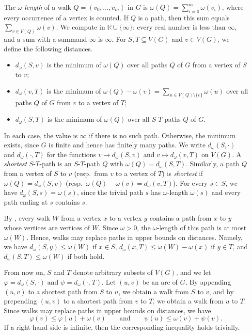 \documentclass[fontsize=12pt,leading=14pt]{fullpaper}
\begin{document}
\begin{definition}\label{def:geo}
  The \emph{$\omega$-length} of a walk $Q=(v_0,\dots,v_m)$ in $G$ is $\omega(Q)=\sum_{i=0}^m\omega(v_i)$, where every occurrence of a vertex is counted.
  If $Q$ is a path, then this sum equals $\sum_{v\in V(Q)}\omega(v)$.
  We compute in $\mathbb R\cup\{\infty\}$: every real number is less than $\infty$, and a sum with a summand $\infty$ is $\infty$.
  For $S,T\subseteq V(G)$ and $v\in V(G)$, we define the following distances.
  \begin{itemize}
    \item $d_\omega(S,v)$ is the minimum of $\omega(Q)$ over all paths $Q$ of $G$ from a vertex of $S$ to $v$;
    \item $d_\omega(v,T)$ is the minimum of $\omega(Q)-\omega(v)=\sum_{u\in V(Q)\setminus\{v\}}\omega(u)$ over all paths $Q$ of $G$ from $v$ to a vertex of $T$;
    \item $d_\omega(S,T)$ is the minimum of $\omega(Q)$ over all $S$-$T$-paths $Q$ of $G$.
  \end{itemize}
  In each case, the value is $\infty$ if there is no such path.
  Otherwise, the minimum exists, since $G$ is finite and hence has finitely many paths.
  We write $d_\omega(S,\cdot)$ and $d_\omega(\cdot,T)$ for the functions $v\mapsto d_\omega(S,v)$ and $v\mapsto d_\omega(v,T)$ on $V(G)$.
  A \emph{shortest} $S$-$T$-path is an $S$-$T$-path $Q$ with $\omega(Q)=d_\omega(S,T)$.
  Similarly, a path $Q$ from a vertex of $S$ to $v$ (resp.\ from $v$ to a vertex of $T$) is \emph{shortest} if $\omega(Q)=d_\omega(S,v)$ (resp.\ $\omega(Q)-\omega(v)=d_\omega(v,T)$).
  For every $s\in S$, we have $d_\omega(S,s)=\omega(s)$, since the trivial path $s$ has $\omega$-length $\omega(s)$ and every path ending at $s$ contains $s$.
\end{definition}

By , every walk $W$ from a vertex $x$ to a vertex $y$ contains a path from $x$ to $y$ whose vertices are vertices of $W$.
Since $\omega>0$, the $\omega$-length of this path is at most $\omega(W)$.
Hence, walks may replace paths in upper bounds on distances.
Namely, we have $d_\omega(S,y)\le\omega(W)$ if $x\in S$, $d_\omega(x,T)\le\omega(W)-\omega(x)$ if $y\in T$, and $d_\omega(S,T)\le\omega(W)$ if both hold.

From now on, $S$ and $T$ denote arbitrary subsets of $V(G)$, and we let $\varphi=d_\omega(S,\cdot)$ and $\psi=d_\omega(\cdot,T)$.
Let $(u,v)$ be an arc of $G$.
By appending $(u,v)$ to a shortest path from $S$ to $u$, we obtain a walk from $S$ to $v$, and by prepending $(u,v)$ to a shortest path from $v$ to $T$, we obtain a walk from $u$ to $T$.
Since walks may replace paths in upper bounds on distances, we have
\begin{equation}\label{eq:geo-triangle}
  \varphi(v)\le\varphi(u)+\omega(v)
  \qquad\text{and}\qquad
  \psi(u)\le\omega(v)+\psi(v).
\end{equation}
If a right-hand side is infinite, then the corresponding inequality holds trivially.
\end{document}
